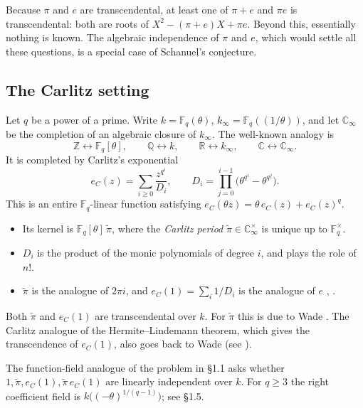 \documentclass[11pt]{amsart}
\theoremstyle{remark}
\numberwithin{equation}{section}
\newcommand{\F}{\mathbb{F}}
\newcommand{\Q}{\mathbb{Q}}
\newcommand{\Z}{\mathbb{Z}}
\newcommand{\R}{\mathbb{R}}
\newcommand{\C}{\mathbb{C}}
\newcommand{\Cinf}{\mathbb{C}_\infty}
\newcommand{\kinf}{k_\infty}
\newcommand{\pit}{\tilde\pi}
\newcommand{\eC}{e_C}
\begin{document}
Because $\pi$ and $e$ are transcendental, at least one of $\pi+e$ and $\pi e$ is transcendental: both are roots of $X^2-(\pi+e)X+\pi e$. Beyond this, essentially nothing is known. The algebraic independence of $\pi$ and $e$, which would settle all these questions, is a special case of Schanuel's conjecture.

\subsection{The Carlitz setting}
Let $q$ be a power of a prime. Write $k=\F_q(\theta)$, $\kinf=\F_q((1/\theta))$, and let $\Cinf$ be the completion of an algebraic closure of $\kinf$. The well-known analogy is
\[
\Z\leftrightarrow\F_q[\theta],\qquad \Q\leftrightarrow k,\qquad \R\leftrightarrow\kinf,\qquad \C\leftrightarrow\Cinf .
\]
It is completed by Carlitz's exponential \cite{Car35}
\[
\eC(z)=\sum_{i\ge0}\frac{z^{q^i}}{D_i},\qquad D_i=\prod_{j=0}^{i-1}\bigl(\theta^{q^i}-\theta^{q^j}\bigr).
\]
This is an entire $\F_q$-linear function satisfying $\eC(\theta z)=\theta\,\eC(z)+\eC(z)^q$.
\begin{itemize}
\item Its kernel is $\F_q[\theta]\,\pit$, where the \emph{Carlitz period} $\pit\in\Cinf^\times$ is unique up to $\F_q^\times$.
\item $D_i$ is the product of the monic polynomials of degree $i$, and plays the role of $n!$.
\item $\pit$ is the analogue of $2\pi i$, and $\eC(1)=\sum_i1/D_i$ is the analogue of $e$ \cite[\S0]{Tha92}, \cite{Tha04}.
\end{itemize}
Both $\pit$ and $\eC(1)$ are transcendental over $k$. For $\pit$ this is due to Wade \cite{Wad41}. The Carlitz analogue of the Hermite--Lindemann theorem, which gives the transcendence of $\eC(1)$, also goes back to Wade (see \cite[\S2]{Pel17}).

The function-field analogue of the problem in \S1.1 asks whether $1,\pit,\eC(1),\pit\,\eC(1)$ are linearly independent over $k$. For $q\ge3$ the right coefficient field is $k\bigl((-\theta)^{1/(q-1)}\bigr)$; see \S1.5.
\end{document}
